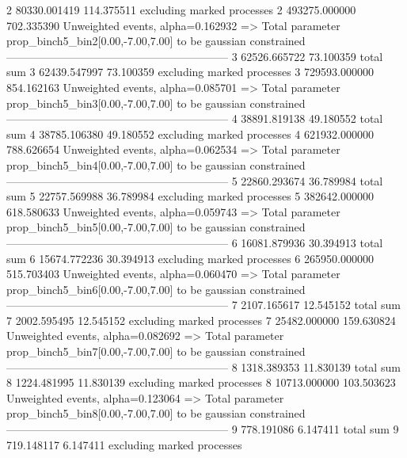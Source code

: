 2          80330.001419    114.375511      excluding marked processes    
2          493275.000000   702.335390      Unweighted events, alpha=0.162932
  => Total parameter prop_binch5_bin2[0.00,-7.00,7.00] to be gaussian constrained
------------------------------------------------------------
3          62526.665722    73.100359       total sum                     
3          62439.547997    73.100359       excluding marked processes    
3          729593.000000   854.162163      Unweighted events, alpha=0.085701
  => Total parameter prop_binch5_bin3[0.00,-7.00,7.00] to be gaussian constrained
------------------------------------------------------------
4          38891.819138    49.180552       total sum                     
4          38785.106380    49.180552       excluding marked processes    
4          621932.000000   788.626654      Unweighted events, alpha=0.062534
  => Total parameter prop_binch5_bin4[0.00,-7.00,7.00] to be gaussian constrained
------------------------------------------------------------
5          22860.293674    36.789984       total sum                     
5          22757.569988    36.789984       excluding marked processes    
5          382642.000000   618.580633      Unweighted events, alpha=0.059743
  => Total parameter prop_binch5_bin5[0.00,-7.00,7.00] to be gaussian constrained
------------------------------------------------------------
6          16081.879936    30.394913       total sum                     
6          15674.772236    30.394913       excluding marked processes    
6          265950.000000   515.703403      Unweighted events, alpha=0.060470
  => Total parameter prop_binch5_bin6[0.00,-7.00,7.00] to be gaussian constrained
------------------------------------------------------------
7          2107.165617     12.545152       total sum                     
7          2002.595495     12.545152       excluding marked processes    
7          25482.000000    159.630824      Unweighted events, alpha=0.082692
  => Total parameter prop_binch5_bin7[0.00,-7.00,7.00] to be gaussian constrained
------------------------------------------------------------
8          1318.389353     11.830139       total sum                     
8          1224.481995     11.830139       excluding marked processes    
8          10713.000000    103.503623      Unweighted events, alpha=0.123064
  => Total parameter prop_binch5_bin8[0.00,-7.00,7.00] to be gaussian constrained
------------------------------------------------------------
9          778.191086      6.147411        total sum                     
9          719.148117      6.147411        excluding marked processes    
